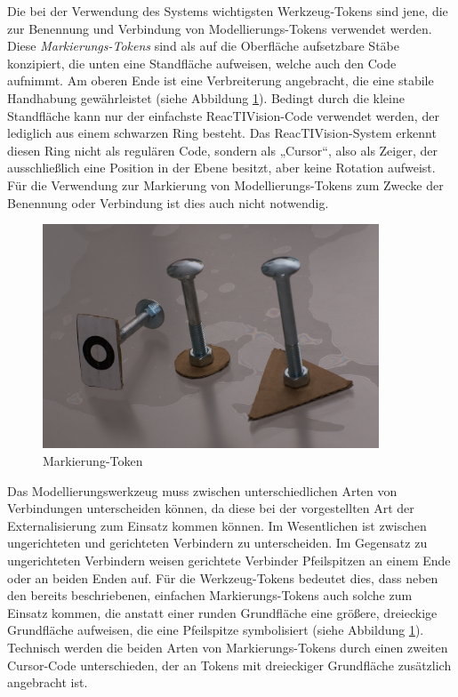 Die bei der Verwendung des Systems wichtigsten Werkzeug-Tokens sind jene, die zur Benennung und Verbindung von Modellierungs-Tokens verwendet werden. Diese \emph{Markierungs-Tokens} sind als auf die Oberfläche aufsetzbare Stäbe konzipiert, die unten eine Standfläche aufweisen, welche auch den Code aufnimmt. Am oberen Ende ist eine Verbreiterung angebracht, die eine stabile Handhabung gewährleistet (siehe Abbildung \ref{fig:img_SystemNeu_Markierungstoken_alle}). Bedingt durch die kleine Standfläche kann nur der einfachste ReacTIVision-Code verwendet werden, der lediglich aus einem schwarzen Ring besteht. Das ReacTIVision-System erkennt diesen Ring nicht als regulären Code, sondern als „Cursor“, also als Zeiger, der ausschließlich eine Position in der Ebene besitzt, aber keine Rotation aufweist. Für die Verwendung zur Markierung von Modellierungs-Tokens zum Zwecke der Benennung oder Verbindung ist dies auch nicht notwendig.

\begin{figure}[htbp]
	\centering
		\includegraphics[width=10cm]{img/SystemNeu/Markierungstoken_alle.jpg}
	\caption{Markierung-Token}
	\label{fig:img_SystemNeu_Markierungstoken_alle}
\end{figure}


Das Modellierungswerkzeug muss zwischen unterschiedlichen Arten von Verbindungen unterscheiden können, da diese bei der vorgestellten Art der Externalisierung zum Einsatz kommen können. Im Wesentlichen ist zwischen ungerichteten und gerichteten Verbindern zu unterscheiden. Im Gegensatz zu ungerichteten Verbindern weisen gerichtete Verbinder Pfeilspitzen an einem Ende oder an beiden Enden auf. Für die Werkzeug-Tokens bedeutet dies, dass neben den bereits beschriebenen, einfachen Markierungs-Tokens auch solche zum Einsatz kommen, die anstatt einer runden Grundfläche eine größere, dreieckige Grundfläche aufweisen, die eine Pfeilspitze symbolisiert (siehe Abbildung \ref{fig:img_SystemNeu_Markierungstoken_alle}). Technisch werden die beiden Arten von Markierungs-Tokens durch einen zweiten Cursor-Code unterschieden, der an Tokens mit dreieckiger Grundfläche zusätzlich angebracht ist.

